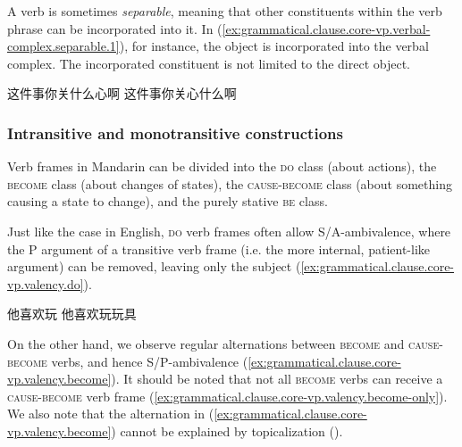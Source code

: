\documentclass[UTF8, a4paper, oneside, scheme=plain, 12pt]{ctexrep}
\newcommand*{\category}[1]{\textsc{#1}}
\begin{document}
A verb is sometimes \emph{separable},
meaning that other constituents within the verb phrase can be incorporated into it.
In (\ref{ex:grammatical.clause.core-vp.verbal-complex.separable.1}),
for instance, the object is incorporated into the verbal complex.
The incorporated constituent is not limited to the direct object.

\begin{exe}
    \ex\label{ex:grammatical.clause.core-vp.verbal-complex.separable.1} \begin{xlist}
        \ex 这件事你关什么心啊
        \ex 这件事你关心什么啊
    \end{xlist}
\end{exe}
 
\subsubsection{Intransitive and monotransitive constructions}\label{sec:grammatical.clause.core-vp.transitivity}

Verb frames in Mandarin can be divided into the \category{do} class (about actions),
the \category{become} class (about changes of states),
the \category{cause}-\category{become} class (about something causing a state to change),
and the purely stative \category{be} class.

Just like the case in English, \category{do} verb frames often allow S/A-ambivalence,
where the P argument of a transitive verb frame (i.e. the more internal, patient-like argument) can be removed, leaving only the subject (\ref{ex:grammatical.clause.core-vp.valency.do}).

\begin{exe}
    \ex\label{ex:grammatical.clause.core-vp.valency.do} \begin{xlist}
        \ex 他喜欢玩
        \ex 他喜欢玩玩具
    \end{xlist}
\end{exe}

On the other hand, we observe regular alternations between \category{become} and \category{cause}-\category{become} verbs,
and hence S/P-ambivalence (\ref{ex:grammatical.clause.core-vp.valency.become}).
It should be noted that not all \category{become} verbs can receive a \category{cause}-\category{become} verb frame (\ref{ex:grammatical.clause.core-vp.valency.become-only}).
We also note that the alternation in (\ref{ex:grammatical.clause.core-vp.valency.become})
cannot be explained by topicalization ().
\end{document}
